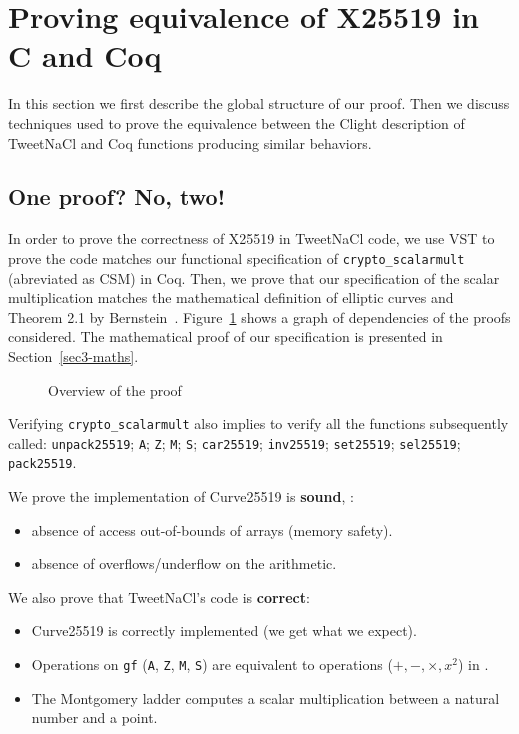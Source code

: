 \section{Proving equivalence of X25519 in C and Coq}
\label{C-Coq}

In this section we first describe the global structure of our proof.
Then we discuss techniques used to prove the equivalence between the
Clight description of TweetNaCl and Coq functions producing similar behaviors.

\subsection{One proof? No, two!}

In order to prove the correctness of X25519 in TweetNaCl code, we use VST to prove
the code matches our functional specification of \texttt{crypto\_scalarmult}
(abreviated as CSM) in Coq. Then, we prove that our specification of the scalar
multiplication matches the mathematical definition of elliptic curves and Theorem 2.1 by
Bernstein~\cite{Ber06}. Figure~\ref{tk:ProofOverview} shows a graph of dependencies
of the proofs considered. The mathematical proof of our specification is presented
in Section~\ref{sec3-maths}.

\begin{figure}[h]
  \centering
  
  \caption{Overview of the proof}
  \label{tk:ProofOverview}
\end{figure}


Verifying \texttt{crypto\_scalarmult} also implies to verify all the functions
subsequently called: \texttt{unpack25519}; \texttt{A}; \texttt{Z}; \texttt{M};
\texttt{S}; \texttt{car25519}; \texttt{inv25519}; \texttt{set25519}; \texttt{sel25519};
\texttt{pack25519}.

We prove the implementation of Curve25519 is \textbf{sound}, \ie:
\begin{itemize}
\item absence of access out-of-bounds of arrays (memory safety).
\item absence of overflows/underflow on the arithmetic.
\end{itemize}
We also prove that TweetNaCl's code is \textbf{correct}:
\begin{itemize}
\item Curve25519 is correctly implemented (we get what we expect).
\item Operations on \texttt{gf} (\texttt{A}, \texttt{Z}, \texttt{M}, \texttt{S})
are equivalent to operations ($+,-,\times,x^2$) in \Zfield.
\item The Montgomery ladder computes a scalar multiplication between a natural
number and a point.
\end{itemize}

